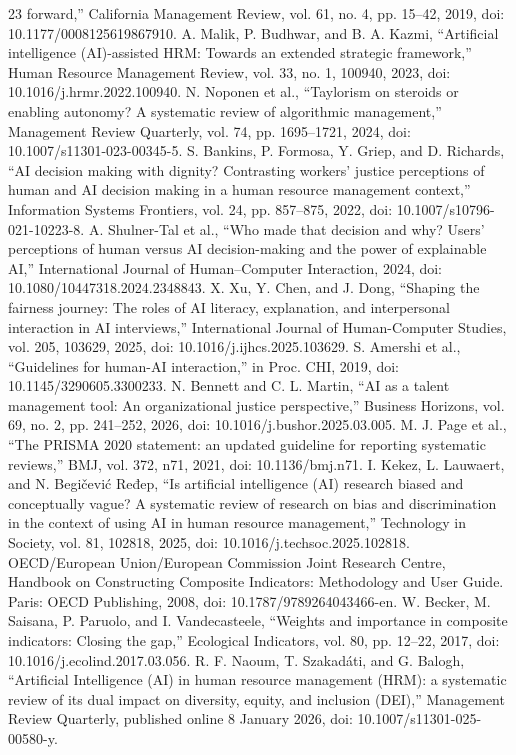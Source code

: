 \documentclass[
  10pt,
  a4paper,
  runningheads]{llncs}
\begin{document}
\begin{thebibliography}{23}
forward,'' California Management Review, vol. 61, no. 4, pp. 15--42,
2019, doi: 10.1177/0008125619867910.
 A. Malik, P. Budhwar, and B. A. Kazmi, ``Artificial
intelligence (AI)-assisted HRM: Towards an extended strategic
framework,'' Human Resource Management Review, vol. 33, no. 1, 100940,
2023, doi: 10.1016/j.hrmr.2022.100940.
 N. Noponen et al., ``Taylorism on steroids or enabling
autonomy? A systematic review of algorithmic management,'' Management
Review Quarterly, vol. 74, pp. 1695--1721, 2024, doi:
10.1007/s11301-023-00345-5.
 S. Bankins, P. Formosa, Y. Griep, and D. Richards, ``AI
decision making with dignity? Contrasting workers' justice perceptions
of human and AI decision making in a human resource management
context,'' Information Systems Frontiers, vol. 24, pp. 857--875, 2022,
doi: 10.1007/s10796-021-10223-8.
 A. Shulner-Tal et al., ``Who made that decision and why? Users'
perceptions of human versus AI decision-making and the power of
explainable AI,'' International Journal of Human--Computer Interaction,
2024, doi: 10.1080/10447318.2024.2348843.
 X. Xu, Y. Chen, and J. Dong, ``Shaping the fairness journey:
The roles of AI literacy, explanation, and interpersonal interaction in
AI interviews,'' International Journal of Human-Computer Studies, vol.
205, 103629, 2025, doi: 10.1016/j.ijhcs.2025.103629.
 S. Amershi et al., ``Guidelines for human-AI interaction,'' in
Proc. CHI, 2019, doi: 10.1145/3290605.3300233.
 N. Bennett and C. L. Martin, ``AI as a talent management tool:
An organizational justice perspective,'' Business Horizons, vol. 69, no.
2, pp. 241--252, 2026, doi: 10.1016/j.bushor.2025.03.005.
 M. J. Page et al., ``The PRISMA 2020 statement: an updated
guideline for reporting systematic reviews,'' BMJ, vol. 372, n71, 2021,
doi: 10.1136/bmj.n71.
 I. Kekez, L. Lauwaert, and N. Begičević Ređep, ``Is artificial
intelligence (AI) research biased and conceptually vague? A systematic
review of research on bias and discrimination in the context of using AI
in human resource management,'' Technology in Society, vol. 81, 102818,
2025, doi: 10.1016/j.techsoc.2025.102818.
 OECD/European Union/European Commission Joint Research Centre,
Handbook on Constructing Composite Indicators: Methodology and User
Guide. Paris: OECD Publishing, 2008, doi: 10.1787/9789264043466-en.
 W. Becker, M. Saisana, P. Paruolo, and I. Vandecasteele,
``Weights and importance in composite indicators: Closing the gap,''
Ecological Indicators, vol. 80, pp. 12--22, 2017, doi:
10.1016/j.ecolind.2017.03.056.
 R. F. Naoum, T. Szakadáti, and G. Balogh, ``Artificial
Intelligence (AI) in human resource management (HRM): a systematic
review of its dual impact on diversity, equity, and inclusion (DEI),''
Management Review Quarterly, published online 8 January 2026, doi:
10.1007/s11301-025-00580-y.
\end{thebibliography}
\end{document}
